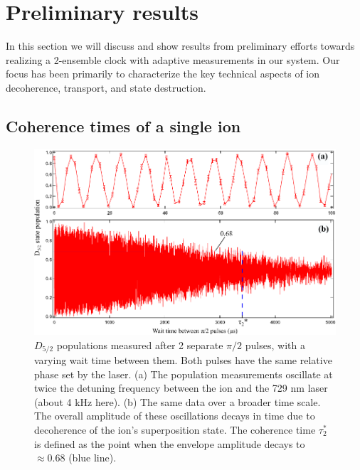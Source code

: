 
\section{Preliminary results}

In this section we will discuss and show results from preliminary efforts towards realizing a 2-ensemble clock with adaptive measurements in our system. Our focus has been primarily to characterize the key technical aspects of ion decoherence, transport, and state destruction. 




\subsection{Coherence times of a single ion}

\begin{figure}[t]
    \begin{center}
        \includegraphics{figures/5/Fig_CoherenceTime2}
        \caption{\label{fig:coherencetime} $D_{5/2}$ populations measured after 2 separate $\pi / 2$ pulses, with a varying wait time between them. Both pulses have the same relative phase set by the laser. (a) The population measurements oscillate at twice the detuning frequency between the ion and the 729 nm laser (about 4 kHz here). (b) The same data over a broader time scale. The overall amplitude of these oscillations decays in time due to decoherence of the ion's superposition state. The coherence time $\tau_2^*$ is defined as the point when the envelope amplitude decays to $\approx 0.68$ (blue line).   }
    \end{center}
\end{figure}

